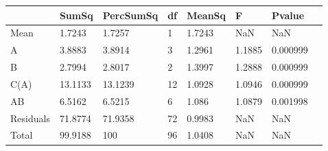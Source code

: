 \begin{table} 
\begin{tabular}{llllllll}
 & SumSq & PercSumSq & df & MeanSq & F & Pvalue \\ 
 \hline 
Mean & 1.7243 & 1.7257 & 1 & 1.7243 & NaN & NaN \\ 
A & 3.8883 & 3.8914 & 3 & 1.2961 & 1.1885 & 0.000999 \\ 
B & 2.7994 & 2.8017 & 2 & 1.3997 & 1.2888 & 0.000999 \\ 
C(A) & 13.1133 & 13.1239 & 12 & 1.0928 & 1.0946 & 0.000999 \\ 
AB & 6.5162 & 6.5215 & 6 & 1.086 & 1.0879 & 0.001998 \\ 
Residuals & 71.8774 & 71.9358 & 72 & 0.9983 & NaN & NaN \\ 
Total & 99.9188 & 100 & 96 & 1.0408 & NaN & NaN \\ 
\end{tabular} 
\end{table} 

